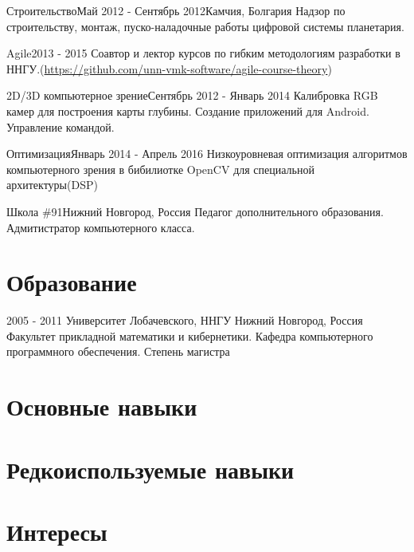 \documentclass[12pt,a4paper]{moderncv}
\begin{document}
\cventry{}
    {Строительство}{Май 2012 - Сентябрь 2012}{Камчия, Болгария}{}
    {Надзор по строительству, монтаж, пуско-наладочные работы цифровой системы планетария.}

\cventry{}
    {Agile}{2013 - 2015}{}{}
    {Соавтор и лектор курсов по гибким методологиям разработки в ННГУ.\newline(\url{https://github.com/unn-vmk-software/agile-course-theory})}

\cventry{}
    {2D/3D компьютерное зрение}{Сентябрь 2012 - Январь 2014}{}{}
    {Калибровка RGB камер для построения карты глубины. Создание приложений для Android. Управление командой.}

\cventry{}
    {Оптимизация}{Январь 2014 - Апрель 2016}{}{}
    {Низкоуровневая оптимизация алгоритмов компьютерного зрения в бибилиотке OpenCV для специальной архитектуры(DSP)}

    {Школа \#91}{Нижний Новгород, Россия}{}{}
    {Педагог дополнительного образования. Адмитистратор компьютерного класса.}

\section{Образование}
  \cventry
    {2005 - 2011}
    {Университет Лобачевского, ННГУ}
    {Нижний Новгород, Россия}
    {}{}
    {Факультет прикладной математики и кибернетики. Кафедра компьютерного программного обеспечения.\newline{}
    Степень магистра}


\section{Основные навыки}

\section{Редкоиспользуемые навыки}

\section{Интересы}
\end{document}
